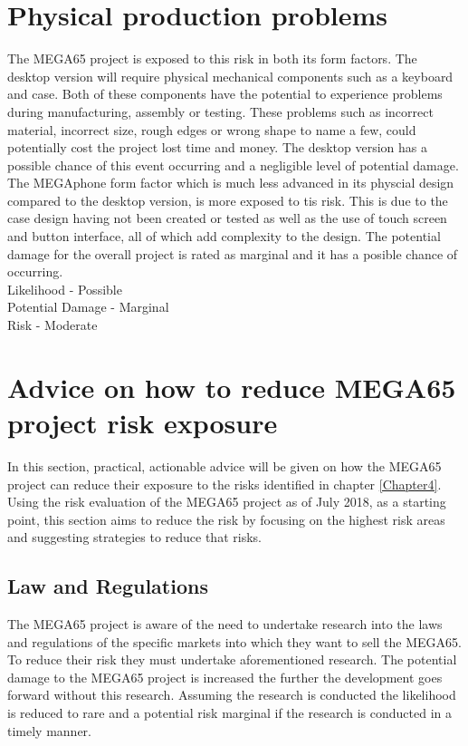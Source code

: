 \section{Physical production problems}
The MEGA65 project is exposed to this risk in both its form factors. The desktop version will require physical mechanical components such as a keyboard and case. Both of these components have the potential to experience problems during manufacturing, assembly or testing. These problems such as incorrect material, incorrect size, rough edges or wrong shape to name a few, could potentially cost the project lost time and money. The desktop version has a possible chance of this event occurring and a negligible level of potential damage. The MEGAphone form factor which is much less advanced in its physcial design compared to the desktop version, is more exposed to tis risk. This is due to the case design having not been created or tested as well as the use of touch screen and button interface, all of which add complexity to the design. The potential damage for the overall project is rated as marginal and it has a posible chance of occurring. \\ 

Likelihood - Possible \\
Potential Damage - Marginal \\
Risk - Moderate \\


\section{Advice on how to reduce MEGA65 project risk exposure}
In this section, practical, actionable advice will be given on how the MEGA65 project can reduce their exposure to the risks identified in chapter \ref{Chapter4}. Using the risk evaluation of the MEGA65 project as of July 2018, as a starting point, this section aims to reduce the risk by focusing on the highest risk areas and suggesting strategies to reduce that risks.

\subsection{Law and Regulations}
The MEGA65 project is aware of the need to undertake research into the laws and regulations of the specific markets into which they want to sell the MEGA65. To reduce their risk they must undertake aforementioned research. The potential damage to the MEGA65 project is increased the further the development goes forward without this research. Assuming the research is conducted the likelihood is reduced to rare and a potential risk marginal if the research is conducted in a timely manner.

